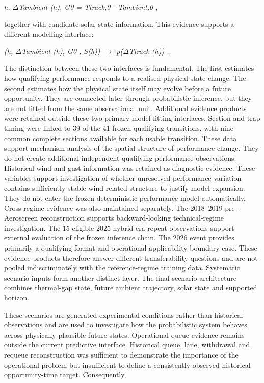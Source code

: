 \begin{center}\textit{h,      \ensuremath{\Delta}Tambient (h),      G0 = Ttrack,0 - Tambient,0 ,}\end{center}

together with candidate solar-state information. This evidence supports a different modelling interface:

\begin{center}\textit{(h, \ensuremath{\Delta}Tambient (h), G0 , S(h)) \ensuremath{\rightarrow} p(\ensuremath{\Delta}Ttrack (h)) .}\end{center}

The distinction between these two interfaces is fundamental. The first estimates how qualifying performance responds to a realised physical-state change. The second estimates how the physical state itself may evolve before a future opportunity. They are connected later through probabilistic inference, but they are not fitted from the same observational unit. Additional evidence products were retained outside these two primary model-fitting interfaces. Section and trap timing were linked to 39 of the 41 frozen qualifying transitions, with nine common complete sections available for each usable transition. These data support mechanism analysis of the spatial structure of performance change. They do not create additional independent qualifying-performance observations. Historical wind and gust information was retained as diagnostic evidence. These variables support investigation of whether unresolved performance variation contains sufficiently stable wind-related structure to justify model expansion. They do not enter the frozen deterministic performance model automatically. Cross-regime evidence was also maintained separately. The 2018--2019 pre-Aeroscreen reconstruction supports backward-looking technical-regime investigation. The 15 eligible 2025 hybrid-era repeat observations support external evaluation of the frozen inference chain. The 2026 event provides primarily a qualifying-format and operational-applicability boundary case. These evidence products therefore answer different transferability questions and are not pooled indiscriminately with the reference-regime training data. Systematic scenario inputs form another distinct layer. The final scenario architecture combines thermal-gap state, future ambient trajectory, solar state and supported horizon.

These scenarios are generated experimental conditions rather than historical observations and are used to investigate how the probabilistic system behaves across physically plausible future states. Operational queue evidence remains outside the current predictive interface. Historical queue, lane, withdrawal and requeue reconstruction was sufficient to demonstrate the importance of the operational problem but insufficient to define a consistently observed historical opportunity-time target. Consequently,

